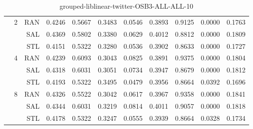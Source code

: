 \begin{center}
\begin{table}[htbp]
\begin{tabular}{ | r | r | r | r | r | r | r | r | r | r | r |}
 & \multirow{3}{*}{2} & RAN & 0.4246 & 0.5667 & 0.3483 & 0.0546 & 0.3893 & 0.9125 & 0.0000 & 0.1763\\ \cline{3-11}
 &   & SAL & 0.4369 & 0.5802 & 0.3380 & 0.0629 & 0.4012 & 0.8812 & 0.0000 & 0.1809\\ \cline{3-11}
 &   & STL & 0.4151 & 0.5322 & 0.3280 & 0.0536 & 0.3902 & 0.8633 & 0.0000 & 0.1727\\ \cline{2-11}
 & \multirow{3}{*}{4} & RAN & 0.4239 & 0.6093 & 0.3043 & 0.0825 & 0.3891 & 0.9375 & 0.0000 & 0.1804\\ \cline{3-11}
 &   & SAL & 0.4318 & 0.6031 & 0.3051 & 0.0734 & 0.3947 & 0.8679 & 0.0000 & 0.1812\\ \cline{3-11}
 &   & STL & 0.4193 & 0.5322 & 0.3495 & 0.0479 & 0.3956 & 0.8664 & 0.0392 & 0.1696\\ \cline{2-11}
 & \multirow{3}{*}{8} & RAN & 0.4326 & 0.5522 & 0.3042 & 0.0617 & 0.3967 & 0.9358 & 0.0000 & 0.1841\\ \cline{3-11}
 &   & SAL & 0.4344 & 0.6031 & 0.3219 & 0.0814 & 0.4011 & 0.9057 & 0.0000 & 0.1818\\ \cline{3-11}
 &   & STL & 0.4178 & 0.5322 & 0.3247 & 0.0555 & 0.3939 & 0.8664 & 0.0328 & 0.1734\\ \cline{2-11}
\hline
\end{tabular}
\caption{grouped-liblinear-twitter-OSB3-ALL-ALL-10}
\end{table}
\end{center}

